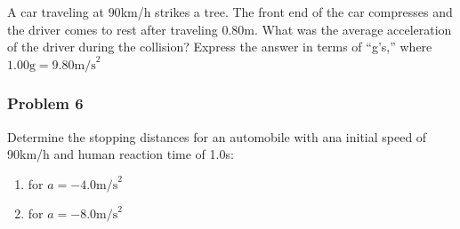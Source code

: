 \documentclass[
  letterpaper,
  DIV=11,
  numbers=noendperiod]{scrartcl}
\providecommand{\tightlist}{%
  \setlength{\itemsep}{0pt}\setlength{\parskip}{0pt}}\usepackage{longtable,booktabs,array}
\begin{document}
A car traveling at \(90\)km/h strikes a tree. The front end of the car
compresses and the driver comes to rest after traveling \(0.80\)m. What
was the average acceleration of the driver during the collision? Express
the answer in terms of ``g's,'' where
\(1.00\text{g} = 9.80 \text{m/s}^2\)

\hypertarget{problem-6}{%
\subsubsection{Problem 6}\label{problem-6}}

Determine the stopping distances for an automobile with ana initial
speed of 90km/h and human reaction time of 1.0s:

\begin{enumerate}
\def\labelenumi{(\alph{enumi})}
\tightlist
\item
  for \(a =-4.0 \text{m/s}^2\)
\item
  for \(a = -8.0 \text{m/s}^2\)
\end{enumerate}
\end{document}
